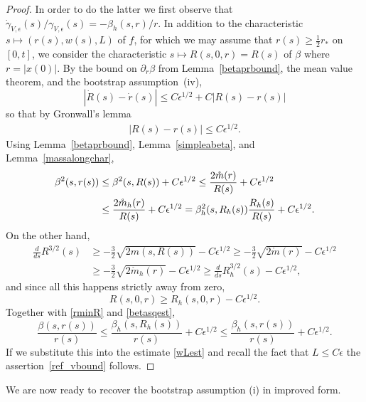 \documentclass[11pt]{article}
\begin{document}
\begin{proof}
  In order to do the latter we first observe that
  $\dot\gamma_{V,\epsilon}(s)/\gamma_{V,\epsilon}(s)= - \beta_h(s,r)/r$.
  In addition to the characteristic $s\mapsto (r(s),w(s),L)$ of $f$,
  for which we may assume that $r(s)\geq \frac{1}{2}r_\ast$ on
  $[0,t]$, we consider the characteristic $s\mapsto R(s,0,r) =R(s)$ of $\beta$
  where $r=|x(0)|$.
  By the bound on $\partial_r\beta$ from Lemma~\ref{betaprbound}, the mean value
  theorem, and the bootstrap assumption~(iv),
  \[
  |\dot R(s) - \dot r(s)| \leq C \epsilon^{1/2} + C |R(s) - r(s)|
  \]
  so that by Gronwall's lemma
  \begin{align}\label{rminR}
    |R(s) - r(s)| \leq C \epsilon^{1/2}.
  \end{align}
  Using Lemma~\ref{betaprbound}, Lemma~\ref{simpleabeta},
  and Lemma~\ref{massalongchar},
  \begin{align} \label{betasqest}
    \beta^2(s,r(s))
    &
    \leq \beta^2(s,R(s)) + C \epsilon^{1/2}
    \leq \frac{2 \mathring m (r)}{R(s)} + C \epsilon^{1/2} \notag \\
    &
    \leq \frac{2 \mathring m_h (r)}{R(s)} + C \epsilon^{1/2}
    = \beta_h^2 (s,R_h(s)) \frac{R_h(s)}{R(s)} + C \epsilon^{1/2}.
  \end{align}
  On the other hand,
  \begin{align*}
    \frac{d}{ds} R^{3/2}(s)
    &\geq
    - \frac{3}{2} \sqrt{2m(s,R(s))} - C \epsilon^{1/2}
    \geq
    - \frac{3}{2} \sqrt{2\mathring m(r)} - C \epsilon^{1/2}\\
    &\geq
    - \frac{3}{2} \sqrt{2\mathring m_h(r)} - C \epsilon^{1/2}
     \geq
    \frac{d}{ds} R_h^{3/2}(s) - C \epsilon^{1/2},
  \end{align*}
  and since all this happens strictly away from zero,
  \[
  R(s,0,r) \geq R_h (s,0,r)- C \epsilon^{1/2}.
  \]
  Together with \eqref{rminR} and \eqref{betasqest},
  \[
  \frac{\beta(s,r(s))}{r(s)} \leq
  \frac{\beta_h(s,R_h(s))}{r(s)} + C \epsilon^{1/2}
  \leq %
  \frac{\beta_h(s,r(s))}{r(s)} + C \epsilon^{1/2}.
  \]
  If we substitute this into the estimate \eqref{wLest} and recall the fact that
  $L\leq C \epsilon$ the assertion~\eqref{ref_vbound} follows.  
\end{proof}

We are now ready to recover the bootstrap assumption (i) in improved form.
\end{document}
